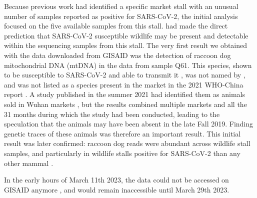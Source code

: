 \documentclass[11pt]{article}
\def \sct {\mbox{SARS-CoV-2}}
\begin{document}
Because previous work \citep{Worobey2022Science} had identified a specific market stall with an unusual number of samples reported as positive for \sct{}, the initial analysis focused on the five available samples from this stall. \citet{Worobey2022Science} had made the direct prediction that \sct{} susceptible wildlife may be present and detectable within the sequencing samples from this stall. The very first result we obtained with the data downloaded from GISAID was the detection of raccoon dog mitochondrial DNA (mtDNA) in the data from sample Q61. This species, shown to be susceptible to \sct{} and able to transmit it \citep{Freuling2020EID}, was not named by \citet{Liu2022RS}, and was not listed as a species present in the market in the 2021 WHO-China report \citep{WHO2021}. A study published in the summer 2021 had identified them as animals sold in Wuhan markets \citep{Xiao2021SciRep}, but the results combined multiple markets and all the 31 months during which the study had been conducted, leading to the speculation that the animals may have been absent in the late Fall 2019. Finding genetic traces of these animals was therefore an important result. This initial result was later confirmed: raccoon dog reads were abundant across wildlife stall samples, and particularly in wildlife stalls positive for \sct{} than any other mammal \citep{ACC2023bioRxiv}.

In the early hours of March 11th 2023, the data could not be accessed on GISAID anymore \citep[foreword]{ACC2023Zenodo}, and would remain inaccessible until March 29th 2023. 
\end{document}

